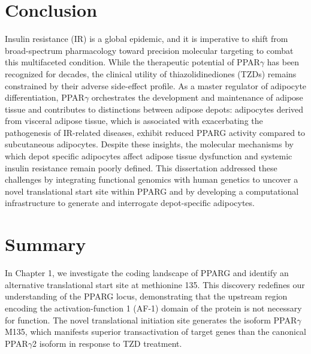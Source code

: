 \begin{dissertationepilogue}

    \setcounter{chapter}{4}
    \setcounter{section}{0}

    \section{Conclusion}
    Insulin resistance (IR) is a global epidemic, and it is imperative to shift from broad-spectrum pharmacology toward precision molecular targeting to combat this multifaceted condition. While the therapeutic potential of PPAR$\gamma$ has been recognized for decades, the clinical utility of thiazolidinediones (TZDs) remains constrained by their adverse side-effect profile\cite{Yki-Jarvinen2004-bc}. As a master regulator of adipocyte differentiation, PPAR$\gamma$ orchestrates the development and maintenance of adipose tissue\cite{Tontonoz2008-pe} and contributes to distinctions between adipose depots: adipocytes derived from visceral adipose tissue, which is associated with exacerbating the pathogenesis of IR-related diseases\cite{Preis2010-eh,Agrawal2023-ee}, exhibit reduced PPARG activity compared to subcutaneous adipocytes\cite{Bradford2019-ps,Mathur2022-fx}. Despite these insights, the molecular mechanisms by which depot specific adipocytes affect adipose tissue dysfunction and systemic insulin resistance remain poorly defined\cite{Sebo2019-nh,Sakers2022-wb}. This dissertation addressed these challenges by integrating functional genomics with human genetics to uncover a novel translational start site within PPARG and by developing a computational infrastructure to generate and interrogate depot-specific adipocytes.

    
    \section{Summary}

    In Chapter 1, we investigate the coding landscape of PPARG and identify an alternative translational start site at methionine 135. This discovery redefines our understanding of the PPARG locus, demonstrating that the upstream region encoding the activation-function 1 (AF-1) domain of the protein is not necessary for function. The novel translational initiation site generates the isoform PPAR$\gamma$ M135, which manifests superior transactivation of target genes than the canonical PPAR$\gamma$2 isoform in response to TZD treatment.
    

\end{dissertationepilogue}
